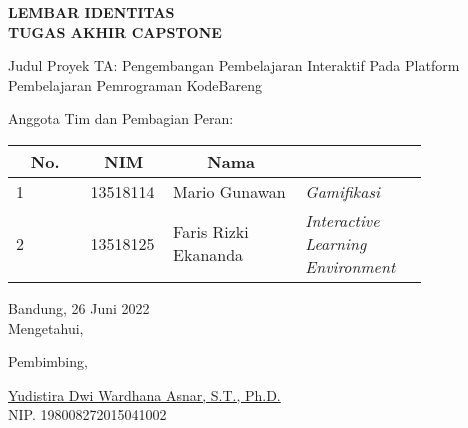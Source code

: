 \clearpage
\pagestyle{empty}

\begin{center}
  \smallskip

  \Large \bfseries \MakeUppercase{Lembar Identitas \\ Tugas Akhir Capstone}
  \vspace{\baselineskip}

  \normalsize \normalfont
  \begin{flushleft}
    Judul Proyek TA\qquad: Pengembangan Pembelajaran Interaktif Pada Platform Pembelajaran Pemrograman KodeBareng
    \medskip

    Anggota Tim dan Pembagian Peran:
    \bigskip
  \end{flushleft}

  \begin{center}
    \begin{tabular}{ |l|p{0.2\linewidth}|p{0.325\linewidth}|>{\raggedright\arraybackslash}p{0.3\linewidth}| }
      \hline
      \multicolumn{1}{|c|}{\textbf{No.}} & \multicolumn{1}{c|}{\textbf{NIM}} & \multicolumn{1}{c|}{\textbf{Nama}} & \multicolumn{1}{c|}{\textbf{Peran}}       \\
      \hline
      1                                  & 13518114                          & Mario Gunawan                      & \textit{Gamifikasi}                       \\
      \hline
      2                                  & 13518125                          & Faris Rizki Ekananda               & \textit{Interactive Learning Environment} \\
      \hline
    \end{tabular}
  \end{center}

  \vfill
  Bandung, 26 Juni 2022 \\
  Mengetahui,

  \vspace{0.5cm}
  Pembimbing,

  \vspace{2cm}
  \underline{Yudistira Dwi Wardhana Asnar, S.T., Ph.D.} \\
  NIP. 198008272015041002
  \vspace{3cm}

\end{center}
\clearpage
